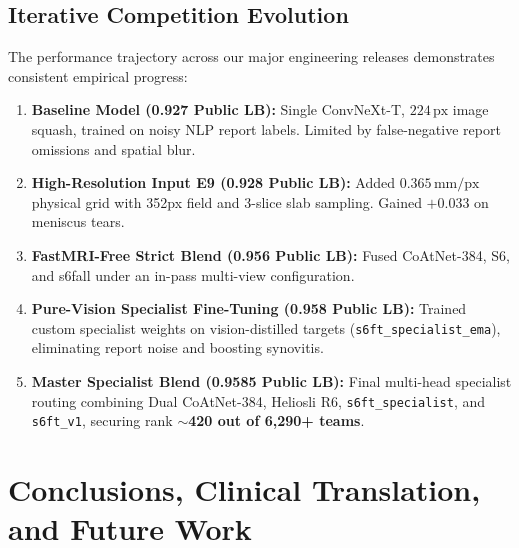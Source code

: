 \documentclass[11pt,a4paper]{article}
\begin{document}
\subsection{Iterative Competition Evolution}
The performance trajectory across our major engineering releases demonstrates consistent empirical progress:
\begin{enumerate}
    \item \textbf{Baseline Model (0.927 Public LB):} Single ConvNeXt-T, $224\,\text{px}$ image squash, trained on noisy NLP report labels. Limited by false-negative report omissions and spatial blur.
    \item \textbf{High-Resolution Input E9 (0.928 Public LB):} Added $0.365\,\text{mm/px}$ physical grid with 352px field and 3-slice slab sampling. Gained $+0.033$ on meniscus tears.
    \item \textbf{FastMRI-Free Strict Blend (0.956 Public LB):} Fused CoAtNet-384, S6, and s6fall under an in-pass multi-view configuration.
    \item \textbf{Pure-Vision Specialist Fine-Tuning (0.958 Public LB):} Trained custom specialist weights on vision-distilled targets (\texttt{s6ft\_specialist\_ema}), eliminating report noise and boosting synovitis.
    \item \textbf{Master Specialist Blend (0.9585 Public LB):} Final multi-head specialist routing combining Dual CoAtNet-384, Heliosli R6, \texttt{s6ft\_specialist}, and \texttt{s6ft\_v1}, securing rank \textbf{$\sim$420 out of 6,290+ teams}.
\end{enumerate}

\section{Conclusions, Clinical Translation, and Future Work}
\end{document}
